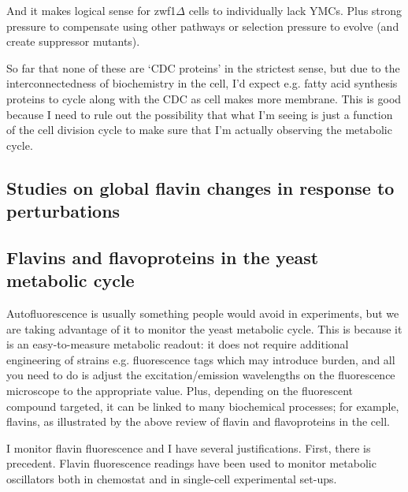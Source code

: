 And it makes logical sense for zwf1$\Delta{}$ cells to individually lack YMCs. Plus strong pressure to compensate using other pathways or selection pressure to evolve (and create suppressor mutants).

So far that none of these are `CDC proteins' in the strictest sense, but due to the interconnectedness of biochemistry in the cell, I'd expect e.g. fatty acid synthesis proteins to cycle along with the CDC as cell makes more membrane.
This is good because I need to rule out the possibility that what I'm seeing is just a function of the cell division cycle to make sure that I'm actually observing the metabolic cycle.

\subsection{Studies on global flavin changes in response to perturbations}
\label{subsec:intro-flavin-perturbations}


\subsection{Flavins and flavoproteins in the yeast metabolic cycle}
\label{subsec:intro-flavin-ymc}

Autofluorescence is usually something people would avoid in experiments, but we are taking advantage of it to monitor the yeast metabolic cycle.
This is because it is an easy-to-measure metabolic readout: it does not require additional engineering of strains e.g. fluorescence tags which may introduce burden, and all you need to do is adjust the excitation/emission wavelengths on the fluorescence microscope to the appropriate value.
Plus, depending on the fluorescent compound targeted, it can be linked to many biochemical processes; for example, flavins, as illustrated by the above review of flavin and flavoproteins in the cell.

I monitor flavin fluorescence and I have several justifications.
First, there is precedent.
Flavin fluorescence readings have been used to monitor metabolic oscillators both in chemostat \citep{murrayRedoxRegulationRespiring2011} and in single-cell \citep{baumgartnerFlavinbasedMetabolicCycles2018} experimental set-ups.

